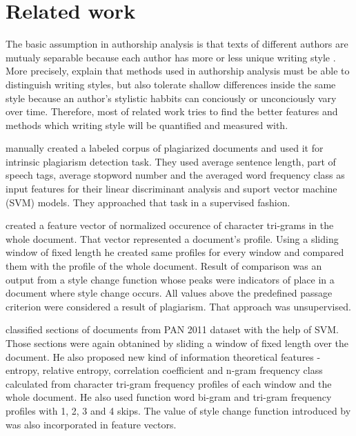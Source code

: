 \documentclass[10pt, a4paper]{article}
\begin{document}
\section{Related work}
The basic assumption in authorship analysis is that texts of different authors are mutualy separable because each author has more or less unique writing style \citep{stamatatos-2009a,ding-2016}. More precisely, \citet{koppel-2009} explain that methods used in authorship analysis must be able to distinguish writing styles, but also tolerate shallow differences inside the same style because an author's stylistic habbits can conciously or unconciously vary over time. Therefore, most of related work tries to find the better features and methods which writing style will be quantified and measured with.

\citet{zu-2006} manually created a labeled corpus of plagiarized documents and used it for intrinsic plagiarism detection task. They used average sentence length, part of speech tags, average stopword number and the averaged word frequency class as input features for their linear discriminant analysis and suport vector machine (SVM) models. They approached that task in a supervised fashion. 

\citet{stamatatos-2009b} created a feature vector of normalized occurence of character tri-grams in the whole document. That vector represented a document's profile. Using a sliding window of fixed length he created same profiles for every window and compared them with the profile of the whole document. Result of comparison was an output from a style change function whose peaks were indicators of place in a document where style change occurs. All values above the predefined passage criterion were considered a result of plagiarism. That approach was unsupervised.

\citet{rahman-2015} classified sections of documents from PAN 2011 dataset with the help of SVM. Those sections were again obtanined by sliding a window of fixed length over the document. He also proposed new kind of information theoretical features - entropy, relative entropy, correlation coefficient and n-gram frequency class calculated from character tri-gram frequency profiles of each window and the whole document. He also used function word bi-gram and tri-gram frequency profiles with 1, 2, 3 and 4 skips. The value of style change function introduced by \citet{stamatatos-2009b} was also incorporated in feature vectors.
\end{document}
